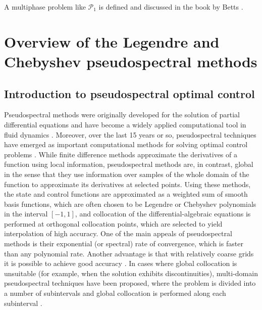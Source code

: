 \documentclass[a4paper,11pt]{report}    %
\begin{document}
A multiphase problem like  $\mathcal{P}_1$ is defined and discussed in the book by Betts \cite{Betts:01}.

\section{Overview of the Legendre and Chebyshev pseudospectral methods}

\subsection{Introduction to pseudospectral optimal control}

Pseudospectral methods were originally developed for the solution of partial differential equations and have become
a widely applied computational tool in fluid dynamics \cite{Canuto:88, Canuto:07}.  
Moreover, over the last 15 years or so, pseudospectral techniques have emerged as important computational methods
for solving optimal control problems \cite{Elnagar:95, Fahroo:01, Fahroo:02b,  Ross:04, Kang:07}. 
While finite difference methods approximate the derivatives of a function using local information, pseudospectral methods are,
in contrast, global in the sense that they use information over samples of the whole domain of the function to approximate its derivatives at selected points.  
Using these methods, the state and control functions are approximated as a weighted sum of smooth basis functions, which are often chosen to be 
Legendre 
or Chebyshev polynomials in the interval $[-1,1]$, and collocation of the differential-algebraic equations is performed at orthogonal collocation points, which are
selected to yield interpolation of high accuracy. 
One of the main appeals of pseudospectral methods is their exponential (or spectral)
rate of convergence, which is faster than any polynomial rate. Another advantage is that with relatively coarse grids it is possible to achieve good accuracy \cite{Trefethen:00}.
In cases where global collocation is unsuitable (for example, when the
solution exhibits discontinuities), multi-domain pseudospectral techniques have been proposed, where the problem
is divided into a number of subintervals and global collocation is
performed along each subinterval \cite{Canuto:07}.
\end{document}
